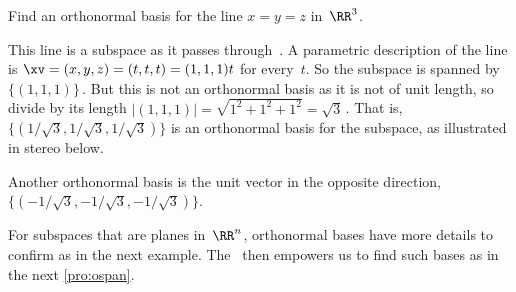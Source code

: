 \begin{example} \label{eg:orthbas1}
Find an orthonormal basis for the line \(x=y=z\) in~\(\RR^3\).
\begin{solution} 
This line is a subspace as it passes through~\ov.
A parametric description of the line is \(\xv=(x,y,z)=(t,t,t)=(1,1,1)t\) for every~\(t\). 
So the subspace is spanned by~\(\{(1,1,1)\}\)\,.
But this is not an orthonormal basis as it is not of unit length, so divide by its length \(|(1,1,1)|=\sqrt{1^2+1^2+1^2}=\sqrt3\)\,.
That is, \(\{(1/{\sqrt3},1/{\sqrt3},1/{\sqrt3})\}\) is an orthonormal basis for the subspace, as illustrated in stereo below.
\begin{center}
 {}
\end{center}
Another orthonormal basis is the unit vector in the opposite direction,~\(\{(-1/{\sqrt3},-1/{\sqrt3},-1/{\sqrt3})\}\).
\end{solution}
\end{example}


For subspaces that are planes in~\(\RR^n\), orthonormal bases have more details to confirm as in the next example.
The \svd\ then empowers us to find such bases as in the next \autoref{pro:ospan}.


